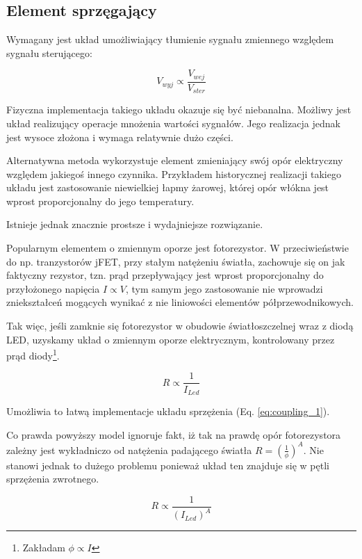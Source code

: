 \documentclass[12pt, a4paper]{article}
\begin{document}
\subsection{Element sprzęgający}
Wymagany jest układ umożliwiający tłumienie sygnału zmiennego względem sygnału sterującego:

\begin{equation}
	V_{wyj} \propto \frac{V_{wej}}{V_{ster}}
	\label{eq:coupling_1}
\end{equation}

Fizyczna implementacja takiego układu okazuje się być niebanalna.
Możliwy jest układ realizujący operacje mnożenia wartości sygnałów. 
Jego realizacja jednak jest wysoce złożona i wymaga relatywnie dużo części.

Alternatywna metoda wykorzystuje element zmieniający swój opór elektryczny względem jakiegoś innego czynnika.
Przykładem historycznej realizacji takiego układu jest zastosowanie niewielkiej łapmy żarowej,
której opór włókna jest wprost proporcjonalny do jego temperatury.

Istnieje jednak znacznie prostsze i wydajniejsze rozwiązanie.

Popularnym elementem o zmiennym oporze jest fotorezystor. W przeciwieństwie do 
np. tranzystorów jFET, przy stałym natężeniu światła, zachowuje się on jak faktyczny rezystor,
tzn. prąd przepływający jest wprost proporcjonalny do przyłożonego napięcia
$I \propto V$, tym samym jego zastosowanie nie wprowadzi zniekształceń mogących wynikać
z nie liniowości elementów półprzewodnikowych.

Tak więc, jeśli zamknie się fotorezystor w obudowie światłoszczelnej wraz z diodą LED,
uzyskamy układ o zmiennym oporze elektrycznym, kontrolowany przez prąd diody\footnote{Zakładam $\phi \propto I$}.

\begin{equation}
	R \propto \frac{1}{I_{Led}}
\end{equation}

Umożliwia to łatwą implementacje układu sprzężenia (Eq. \ref{eq:coupling_1}). 

Co prawda powyższy model ignoruje fakt,
iż tak na prawdę opór fotorezystora zależny jest wykładniczo od natężenia padającego światła
$R = \left(\frac{1}{\phi}\right)^A$. Nie stanowi jednak to dużego problemu ponieważ układ ten znajduje się w 
pętli sprzężenia zwrotnego.

\begin{equation}
	R \propto \frac{1}{(I_{Led})^A}
\end{equation}
\end{document}
